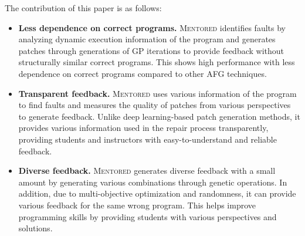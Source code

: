\documentclass[10pt,conference]{IEEEtran}
\begin{document}
    The contribution of this paper is as follows:
    \begin{itemize}
        \item \textbf{Less dependence on correct programs.} \textsc{Mentored} identifies faults by analyzing dynamic execution information of the program and generates patches through generations of GP iterations to provide feedback without structurally similar correct programs. This shows high performance with less dependence on correct programs compared to other AFG techniques.
        
        \item \textbf{Transparent feedback.} \textsc{Mentored} uses various information of the program to find faults and measures the quality of patches from various perspectives to generate feedback. Unlike deep learning-based patch generation methods, it provides various information used in the repair process transparently, providing students and instructors with easy-to-understand and reliable feedback.
        
        \item \textbf{Diverse feedback.} \textsc{Mentored} generates diverse feedback with a small amount by generating various combinations through genetic operations. In addition, due to multi-objective optimization and randomness, it can provide various feedback for the same wrong program. This helps improve programming skills by providing students with various perspectives and solutions.
    \end{itemize}
\end{document}
